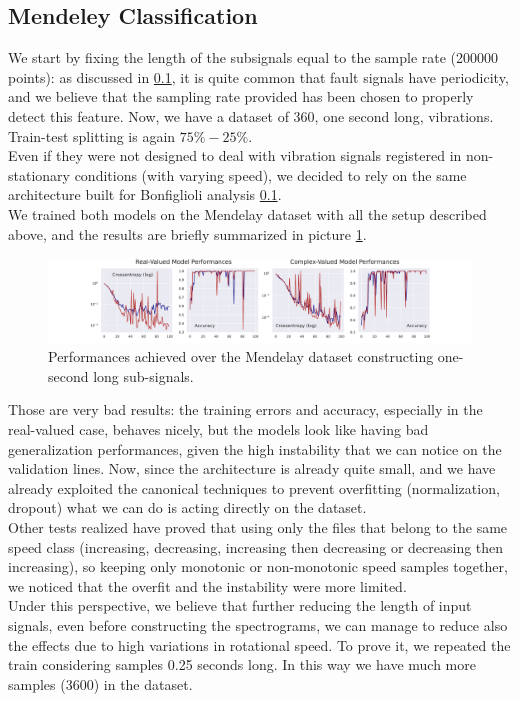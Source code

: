 \documentclass[../main.tex]{subfiles}
\begin{document}
\subsection{Mendeley Classification}

We start by fixing the length of the subsignals equal to the sample rate (200000 points): as discussed in \ref{}, it is quite common that fault signals have periodicity, and we believe that the sampling rate provided has been chosen to properly detect this feature. Now, we have a dataset of 360, one second long, vibrations. Train-test splitting is again $75\%-25\%$.\\
Even if they were not designed to deal with vibration signals registered in non-stationary conditions (with varying speed), we decided to rely on the same architecture built for Bonfiglioli analysis \ref{}.\\
We trained both models on the Mendelay dataset with all the setup described above, and the results are briefly summarized in picture \ref{fig:mendeley_train_bad}.	
\begin{figure}[ht]
	\centering
	\includegraphics[width=\textwidth]{pictures/mendeley_train_bad}
	\caption{Performances achieved over the Mendelay dataset constructing one-second long sub-signals.}
	\label{fig:mendeley_train_bad}
\end{figure}
Those are very bad results: the training errors and accuracy, especially in the real-valued case, behaves nicely, but the models look like having bad generalization performances, given the high instability that we can notice on the validation lines. Now, since the architecture is already quite small, and we have already exploited the canonical techniques to prevent overfitting (normalization, dropout) what we can do is acting directly on the dataset.\\
Other tests realized have proved that using only the files that belong to the same speed class (increasing, decreasing, increasing then decreasing or decreasing then increasing), so keeping only monotonic or non-monotonic speed samples together, we noticed that the overfit and the instability were more limited.\\
Under this perspective, we believe that further reducing the length of input signals, even before constructing the spectrograms, we can manage to reduce also the effects due to high variations in rotational speed. To prove it, we repeated the train considering samples 0.25 seconds long. In this way we have much more samples (3600) in the dataset.
\end{document}
